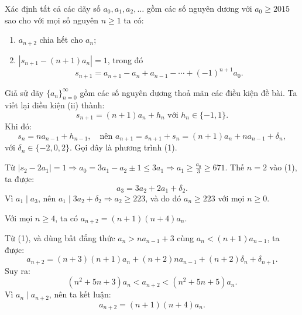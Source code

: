 \ifshowproblemandsoln
\ifshowproblem\begin{problem}\label{problem:APMO-2015-P5}\fi
\ifshowsoln\begin{problem}\fi
    Xác định tất cả các dãy số \( a_0, a_1, a_2, \ldots \) gồm các số nguyên dương với \( a_0 \ge 2015 \)
    sao cho với mọi số nguyên \( n \ge 1 \) ta có:
    \begin{enumerate}[topsep=0pt, partopsep=0pt, itemsep=0pt, label=(\roman*)]
        \item \( a_{n+2} \) chia hết cho \( a_n \);
        \item \( \left| s_{n+1} - (n + 1)a_n \right| = 1 \), trong đó
        \[
            s_{n+1} = a_{n+1} - a_n + a_{n-1} - \cdots + (-1)^{n+1} a_0.
        \]
    \end{enumerate}
\end{problem}
\fi

\ifshowsoln
\begin{soln}\footnotemark
    Giả sử dãy \( \{a_n\}_{n=0}^{\infty} \) gồm các số nguyên dương thoả mãn các điều kiện đề bài. Ta viết lại điều kiện (ii) thành:
    \[
        s_{n+1} = (n + 1)a_n + h_n \text{ với } h_n \in \{-1, 1\}.
    \]
    Khi đó:
    \[
        s_n = na_{n-1} + h_{n-1}, \quad \text{nên } a_{n+1} = s_{n+1} + s_n = (n+1)a_n + na_{n-1} + \delta_n,
    \]
    với \( \delta_n \in \{-2, 0, 2\} \). Gọi đây là phương trình (1).

    Từ \( |s_2 - 2a_1| = 1 \Rightarrow a_0 = 3a_1 - a_2 \pm 1 \le 3a_1 \Rightarrow a_1 \ge \frac{a_0}{3} \ge 671 \).  
    Thế \( n = 2 \) vào (1), ta được:
    \[
        a_3 = 3a_2 + 2a_1 + \delta_2.
    \]
    Vì \( a_1 \mid a_3 \), nên \( a_1 \mid 3a_2 + \delta_2 \Rightarrow a_2 \ge 223 \), và do đó \( a_n \ge 223 \) với mọi \( n \ge 0 \).

    \begin{lemma*}
        Với mọi \( n \ge 4 \), ta có \( a_{n+2} = (n+1)(n+4)a_n \).
    \end{lemma*}
    \begin{subproof}
        Từ (1), và dùng bất đẳng thức \( a_n > na_{n-1} + 3 \) cùng \( a_n < (n+1)a_{n-1} \), ta được:
        \[
            a_{n+2} = (n+3)(n+1)a_n + (n+2)na_{n-1} + (n+2)\delta_n + \delta_{n+1}.
        \]
        Suy ra:
        \[
            (n^2 + 5n + 3)a_n < a_{n+2} < (n^2 + 5n + 5)a_n.
        \]
        Vì \( a_n \mid a_{n+2} \), nên ta kết luận:
        \[
            a_{n+2} = (n+1)(n+4)a_n.
        \]
    \end{subproof}


\end{soln}
\end{problem}
